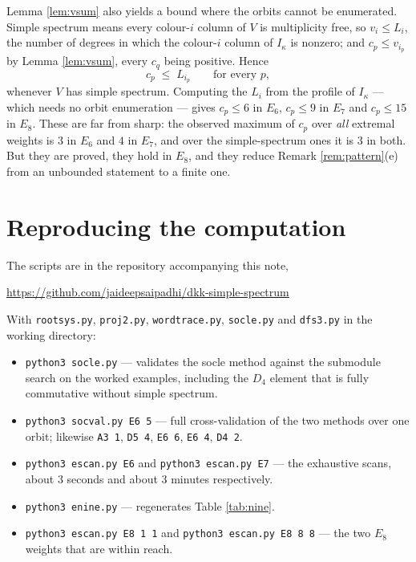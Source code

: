 \documentclass[reqno]{amsart}
\theoremstyle{plain}
\theoremstyle{definition}
\newcommand{\ka}{\kappa}
\begin{document}
Lemma \ref{lem:vsum} also yields a bound where the orbits cannot be
enumerated.  Simple spectrum means every colour-$i$ column of $V$ is
multiplicity free, so $v_i\le L_i$, the number of degrees in which the
colour-$i$ column of $I_\ka$ is nonzero; and $c_p\le v_{i_p}$ by Lemma
\ref{lem:vsum}, every $c_q$ being positive.  Hence
\[
   c_p\;\le\;L_{i_p}\qquad\text{for every }p,
\]
whenever $V$ has simple spectrum.  Computing the $L_i$ from the profile of
$I_\ka$ --- which needs no orbit enumeration --- gives $c_p\le6$ in $E_6$,
$c_p\le9$ in $E_7$ and $c_p\le15$ in $E_8$.  These are far from sharp: the
observed maximum of $c_p$ over \emph{all} extremal weights is $3$ in $E_6$ and
$4$ in $E_7$, and over the simple-spectrum ones it is $3$ in both.  But they
are proved, they hold in $E_8$, and they reduce Remark
\ref{rem:pattern}(e) from an unbounded statement to a finite one.

\section{Reproducing the computation}

The scripts are in the repository accompanying this note,
\begin{center}
\url{https://github.com/jaideepsaipadhi/dkk-simple-spectrum}
\end{center}
With
\verb|rootsys.py|, \verb|proj2.py|, \verb|wordtrace.py|, \verb|socle.py| and
\verb|dfs3.py| in the working directory:

\begin{itemize}
\item \verb|python3 socle.py| --- validates the socle method against the
submodule search on the worked examples, including the $D_4$ element that is
fully commutative without simple spectrum.
\item \verb|python3 socval.py E6 5| --- full cross-validation of the two
methods over one orbit; likewise \verb|A3 1|, \verb|D5 4|, \verb|E6 6|,
\verb|E6 4|, \verb|D4 2|.
\item \verb|python3 escan.py E6| and \verb|python3 escan.py E7| --- the
exhaustive scans, about $3$ seconds and about $3$ minutes respectively.
\item \verb|python3 enine.py| --- regenerates Table \ref{tab:nine}.
\item \verb|python3 escan.py E8 1 1| and \verb|python3 escan.py E8 8 8| ---
the two $E_8$ weights that are within reach.
\end{itemize}
\end{document}
